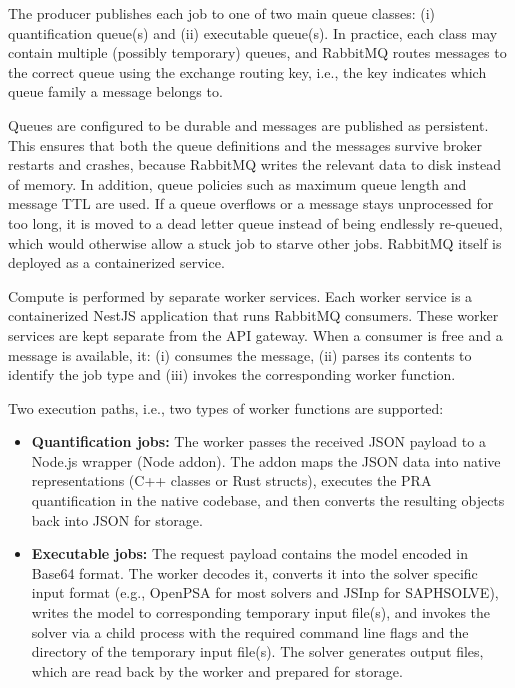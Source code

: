 The producer publishes each job to one of two main queue classes: (i) quantification queue(s) and (ii) executable queue(s). In practice, each class may contain multiple (possibly temporary) queues, and RabbitMQ routes messages to the correct queue using the exchange routing key, i.e., the key indicates which queue family a message belongs to.

Queues are configured to be durable and messages are published as persistent. This ensures that both the queue definitions and the messages survive broker restarts and crashes, because RabbitMQ writes the relevant data to disk instead of memory. In addition, queue policies such as maximum queue length and message TTL are used. If a queue overflows or a message stays unprocessed for too long, it is moved to a dead letter queue instead of being endlessly re-queued, which would otherwise allow a stuck job to starve other jobs. RabbitMQ itself is deployed as a containerized service.

Compute is performed by separate worker services. Each worker service is a containerized NestJS application that runs RabbitMQ consumers. These worker services are kept separate from the API gateway. When a consumer is free and a message is available, it: (i) consumes the message, (ii) parses its contents to identify the job type and (iii) invokes the corresponding worker function.

Two execution paths, i.e., two types of worker functions are supported:
\begin{itemize}
    \item \textbf{Quantification jobs:} The worker passes the received JSON payload to a Node.js wrapper (Node addon). The addon maps the JSON data into native representations (C++ classes or Rust structs), executes the PRA quantification in the native codebase, and then converts the resulting objects back into JSON for storage.
    
    \item \textbf{Executable jobs:} The request payload contains the model encoded in Base64 format. The worker decodes it, converts it into the solver specific input format (e.g., OpenPSA for most solvers and JSInp for SAPHSOLVE), writes the model to corresponding temporary input file(s), and invokes the solver via a child process with the required command line flags and the directory of the temporary input file(s). The solver generates output files, which are read back by the worker and prepared for storage.
\end{itemize}

